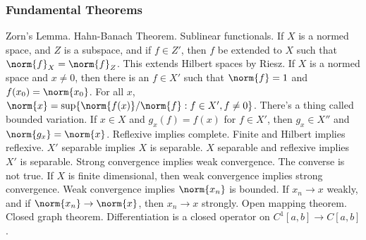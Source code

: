 \documentclass[crop=false,class=book,oneside]{standalone}
\begin{document}
            \subsubsection{Fundamental Theorems}
                Zorn's Lemma. Hahn-Banach Theorem. Sublinear functionals.
                If $X$ is a normed space, and $Z$ is a subspace, and if
                $f\in{Z'}$, then $f$ be extended to $X$ such that
                $\norm{f}_{X}=\norm{f}_{Z}$.
                This extends Hilbert spaces by Riesz.
                If $X$ is a normed space
                and $x\ne{0}$, then there is an $f\in{X'}$ such that
                $\norm{f}=1$ and $f(x_{0})=\norm{x_{0}}$.
                For all $x$,
                $\norm{x}=\sup\{\norm{f(x)}/\norm{f}:f\in{X'},f\ne{0}\}$.
                There's a thing called bounded variation.
                If $x\in{X}$ and
                $g_{x}(f)=f(x)$ for $f\in{X'}$, then
                $g_{x}\in{X''}$ and $\norm{g_{x}}=\norm{x}$.
                Reflexive implies complete.
                Finite and Hilbert implies reflexive.
                $X'$ separable implies $X$ is separable.
                $X$ separable and reflexive implies
                $X'$ is separable.
                Strong convergence implies weak convergence.
                The converse is not true. If $X$ is finite
                dimensional, then weak convergence
                implies strong convergence. Weak convergence implies
                $\norm{x_{n}}$ is bounded. If
                $x_{n}\rightarrow{x}$ weakly, and if
                $\norm{x_{n}}\rightarrow\norm{x}$, then
                $x_{n}\rightarrow{x}$ strongly.
                Open mapping theorem.
                Closed graph theorem.
                Differentiation is a closed operator on
                $C^{1}[a,b]\rightarrow{C[a,b]}$.
\end{document}
